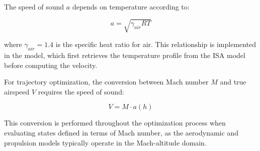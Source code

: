 The speed of sound $a$ depends on temperature according to:

\begin{equation}
a = \sqrt{\gamma_{air}RT}
\end{equation}

where $\gamma_{air} = 1.4$ is the specific heat ratio for air. This relationship is implemented in the model, which first retrieves the temperature profile from the ISA model before computing the velocity.

For trajectory optimization, the conversion between Mach number $M$ and true airspeed $V$ requires the speed of sound:

\begin{equation}
V = M \cdot a(h)
\end{equation}

This conversion is performed throughout the optimization process when evaluating states defined in terms of Mach number, as the aerodynamic and propulsion models typically operate in the Mach-altitude domain.
